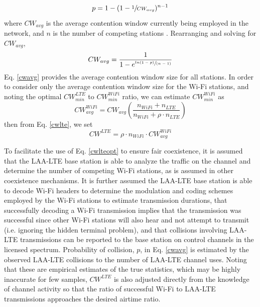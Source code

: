 \begin{equation}\label{pcollision}
p = 1-(1-\sfrac{1}{CW_{avg}})^{n-1}
\end{equation}
where $CW_{avg}$ is the average contention window currently being employed in the network, and $n$ is the number of competing stations \cite{vu}.  Rearranging and solving for $CW_{avg}$,
\begin{equation}\label{cwavg}
CW_{avg} = \frac{1}{1-e^{ \sfrac{ln(1-p)}{(n-1)} }}
\end{equation}
Eq. \ref{cwavg} provides the average contention window size for all stations.  In order to consider only the average contention window size for the \mbox{Wi-Fi} stations, and noting the optimal $CW^{LTE}_{min}$ to $CW^{WiFi}_{min}$ ratio, we can estimate $CW^{WiFi}_{min}$ as
\begin{equation}\label{cwwifi}
CW^{WiFi}_{avg} = CW_{avg}\left ( \frac{n_{WiFi} + n_{LTE}}{n_{WiFi} + \rho\cdot n_{LTE}} \right )
\end{equation}
then from Eq. \ref{cwlte}, we set 
\begin{equation}\label{cwlteopt}
CW^{LTE} = \rho \cdot n_{WiFi} \cdot{CW^{WiFi}_{avg}}
\end{equation}

To facilitate the use of Eq. \ref{cwlteopt} to ensure fair coexistence, it is assumed that the \mbox{LAA-LTE} base station is able to analyze the traffic on the channel and determine the number of competing \mbox{Wi-Fi} stations, as is assumed in other coexistence mechanisms.  It is further assumed the \mbox{LAA-LTE} base station is able to decode \mbox{Wi-Fi} headers to determine the modulation and coding schemes employed by the \mbox{Wi-Fi} stations to estimate transmission durations, that successfully decoding a \mbox{Wi-Fi} transmission implies that the transmission was successful since other \mbox{Wi-Fi} stations will also hear and not attempt to transmit (i.e. ignoring the hidden terminal problem), and that collisions involving \mbox{LAA-LTE} transmissions can be reported to the base station on control channels in the licensed spectrum.  Probability of collision, $p$, in Eq. \ref{cwavg} is estimated by the observed \mbox{LAA-LTE} collisions to the number of \mbox{LAA-LTE} channel uses.  Noting that these are empirical estimates of the true statistics, which may be highly inaccurate for few samples, $CW^{LTE}$ is also adjusted directly from the knowledge of channel activity so that the ratio of successful \mbox{Wi-Fi} to \mbox{LAA-LTE} transmissions approaches the desired airtime ratio. 



